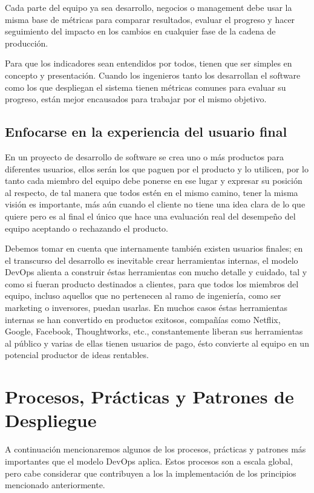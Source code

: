 \documentclass[conference]{IEEEtran}
\begin{document}
Cada parte del equipo ya sea desarrollo, negocios o management debe usar la misma base de métricas para comparar resultados, evaluar el progreso y hacer seguimiento del impacto en los cambios en cualquier fase de la cadena de producción.

Para que los indicadores sean entendidos por todos, tienen que ser simples en concepto y presentación. Cuando los ingenieros tanto los desarrollan el software como los que despliegan el sistema tienen métricas comunes para evaluar su progreso, están mejor encausados para trabajar por el mismo objetivo.

\subsection{Enfocarse en la experiencia del usuario final}

En un proyecto de desarrollo de software se crea uno o más productos para diferentes usuarios, ellos serán los que paguen por el producto y lo utilicen, por lo tanto cada miembro del equipo debe ponerse en ese lugar y expresar su posición al respecto, de tal manera que todos estén en el mismo camino, tener la misma visión es importante, más aún cuando el cliente no tiene una idea clara de lo que quiere pero es al final el único que hace una evaluación real del desempeño del equipo aceptando o rechazando el producto.

Debemos tomar en cuenta que internamente también existen usuarios finales; en el transcurso del desarrollo es inevitable crear herramientas internas, el modelo DevOps alienta a construir éstas herramientas con mucho detalle y cuidado, tal y como si fueran producto destinados a clientes, para que todos los miembros del equipo, incluso aquellos que no pertenecen al ramo de ingeniería, como ser marketing o inversores, puedan usarlas. En muchos casos éstas herramientas internas se han convertido en productos exitosos, compañías como Netflix, Google, Facebook, Thoughtworks, etc., constantemente liberan sus herramientas al público y varias de ellas tienen usuarios de pago, ésto convierte al equipo en un potencial productor de ideas rentables.

\section{Procesos, Prácticas y Patrones de Despliegue}

A continuación mencionaremos algunos de los procesos, prácticas y patrones más importantes que el modelo DevOps aplica. Estos procesos son a escala global, pero cabe considerar que contribuyen a los la implementación de los principios mencionado anteriormente.
\end{document}
